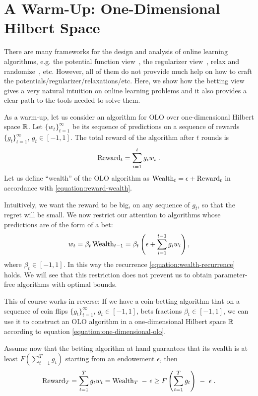 \section{A Warm-Up: One-Dimensional Hilbert Space}
\label{section:one-dimensional-hilbert-space-olo}

There are many frameworks for the design and analysis of online learning
algorithms, e.g. the potential function view~\cite{Cesa-Bianchi-Lugosi-2006},
the regularizer view~\cite{Shalev-Shwartz-2011}, relax and randomize~\cite{}, etc. However, all of
them do not provvide much help on how to craft the
potentials/regularizer/relaxations/etc.  Here, we show how the betting view
gives a very natural intuition on online learning problems and it also provides
a clear path to the tools needed to solve them.

As a warm-up, let us consider an algorithm for OLO over one-dimensional Hilbert space $\mathbb{R}$.
Let $\{w_t\}_{t=1}^\infty$ be its sequence of predictions on a sequence of
rewards $\{g_t\}_{t=1}^\infty$, $g_t \in [-1,1]$. The total reward of the
algorithm after $t$ rounds is
\[
\operatorname{Reward}_t = \sum_{i=1}^t g_i w_i \; .
\]
Let us define ``wealth'' of the OLO algorithm as $\operatorname{Wealth}_t = \epsilon +
\operatorname{Reward}_t$ in accordance with \eqref{equation:reward-wealth}.

Intuitively, we want the reward to be big, on any sequence of $g_t$, so that
the regret will be small. We now restrict our attention to algorithms whose
predictions are of the form of a bet:
\begin{equation}
\label{equation:one-dimensional-olo}
w_t = \beta_t \operatorname{Wealth}_{t-1}
= \beta_t \left(\epsilon+ \sum_{i=1}^{t-1} g_i w_i \right),
\end{equation}
where $\beta_t \in [-1,1]$. In this way the recurrence
\eqref{equation:wealth-recurrence} holds. We will see that this restriction
does not prevent us to obtain parameter-free algorithms with optimal bounds.

This of course works in reverse: If we have a coin-betting algorithm that on a
sequence of coin flips $\{g_t\}_{t=1}^\infty$, $g_t \in [-1,1]$, bets fractions
$\beta_t \in [-1,1]$, we can use it to construct an OLO algorithm in a
one-dimensional Hilbert space $\mathbb{R}$ according to equation
\eqref{equation:one-dimensional-olo}.

Assume now that the betting algorithm at hand guarantees that its wealth is at least $F(\sum_{t=1}^T g_t)$ starting from an endowement $\epsilon$, then 
\begin{equation}
\label{equation:one-dimensional-olo-reward-lower-bound}
\Reward_T
= \sum_{t=1}^T g_t w_t
= \Wealth_T \ - \ \epsilon \ge F\left(\sum_{t=1}^T g_t \right) \ - \ \epsilon \; .
\end{equation}

